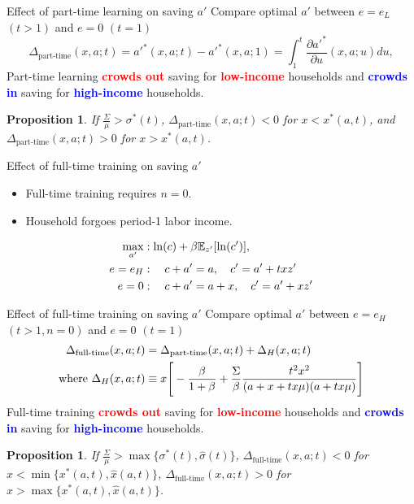 \documentclass[serif, aspectratio=169]{beamer}
\theoremstyle{remark}
\theoremstyle{plain}
\newtheorem{proposition}[theorem]{Proposition}
\begin{document}
\begin{frame}{Effect of part-time learning on saving $a'$}
Compare optimal $a'$ between $e=e_L$ $(t>1)$ and $e=0$ $(t=1)$
\begin{equation} \label{eq:dadt_integral}
    \Delta_{\text{part-time}}(x,a;t) = a'^*(x,a;t) - a'^*(x,a;1) = \int_1^t \frac{\partial a'^*}{\partial u}(x,a;u) du,
\end{equation}
Part-time learning \textcolor{red}{\textbf{crowds out}} saving for \textcolor{red}{\textbf{low-income}} households and \textcolor{blue}{\textbf{crowds in}} saving for \textcolor{blue}{\textbf{high-income}} households.
\begin{proposition}\label{prop:dadt}
    If $\frac{\Sigma}{\mu}>\sigma^*(t)$, $\Delta_{\text{part-time}}(x,a;t)<0$ for $x<x^\ast(a,t)$, and $\Delta_{\text{part-time}}(x,a;t)>0$ for $x>x^\ast(a,t)$.
\end{proposition}

\end{frame}

\begin{frame}{Effect of full-time training on saving $a'$}
\begin{itemize}
    \item Full-time training requires $n=0$.
    \item Household forgoes period-1 labor income.
\end{itemize}
\begin{align}
\max_{a'} &: \ln(c) + \beta \mathbb{E}_{z'}[\ln(c')],\notag\\
e=e_H&: \quad c + a' = a, \quad c' = a' + txz'\\
e=0&: \quad c + a' = a + x, \quad c' = a' + xz'
\end{align}
\end{frame}

\begin{frame}{Effect of full-time training on saving $a'$}
Compare optimal $a'$ between $e=e_H$ $(t>1,n=0)$ and $e=0$ $(t=1)$
\begin{align}
    \Delta_{\text{full-time}}(x,a;t) &=\Delta_{\text{part-time}}(x,a;t) + \Delta_H(x,a;t) \notag \\
    \text{where } \Delta_H(x,a;t) &\equiv x \Bigg[ -\frac{\beta}{1+\beta} + \frac{\Sigma}{\beta} \frac{t^2 x^2}{(a + x + t x \mu)(a + t x \mu)} \Bigg]
\end{align}
Full-time training \textcolor{red}{\textbf{crowds out}} saving for \textcolor{red}{\textbf{low-income}} households and \textcolor{blue}{\textbf{crowds in}} saving for \textcolor{blue}{\textbf{high-income}} households.
\begin{proposition}\label{prop:fulltime}
If $\frac{\Sigma}{\mu}>\max\{\sigma^*(t),\hat{\sigma}(t)\}$, $\Delta_{\text{full-time}}(x,a;t)<0$ for $x<\min\{x^*(a,t),\hat{x}(a,t)\}$, $\Delta_{\text{full-time}}(x,a;t)>0$ for $x>\max\{x^*(a,t),\hat{x}(a,t)\}$.
\end{proposition}

\end{frame}
\end{document}
